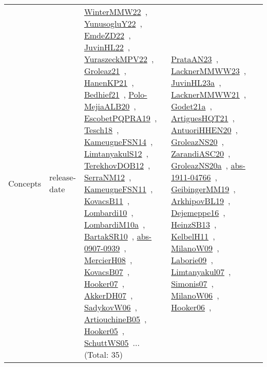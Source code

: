 {\begin{longtable}{lp{3cm}>{\raggedright\arraybackslash}p{6cm}>{\raggedright\arraybackslash}p{6cm}>{\raggedright\arraybackslash}p{8cm}}
Concepts & release-date & \href{works/WinterMMW22.pdf}{WinterMMW22}~\cite{WinterMMW22}, \href{works/YunusogluY22.pdf}{YunusogluY22}~\cite{YunusogluY22}, \href{works/EmdeZD22.pdf}{EmdeZD22}~\cite{EmdeZD22}, \href{works/JuvinHL22.pdf}{JuvinHL22}~\cite{JuvinHL22}, \href{works/YuraszeckMPV22.pdf}{YuraszeckMPV22}~\cite{YuraszeckMPV22}, \href{works/Groleaz21.pdf}{Groleaz21}~\cite{Groleaz21}, \href{works/HanenKP21.pdf}{HanenKP21}~\cite{HanenKP21}, \href{works/Bedhief21.pdf}{Bedhief21}~\cite{Bedhief21}, \href{works/Polo-MejiaALB20.pdf}{Polo-MejiaALB20}~\cite{Polo-MejiaALB20}, \href{works/EscobetPQPRA19.pdf}{EscobetPQPRA19}~\cite{EscobetPQPRA19}, \href{works/Tesch18.pdf}{Tesch18}~\cite{Tesch18}, \href{works/KameugneFSN14.pdf}{KameugneFSN14}~\cite{KameugneFSN14}, \href{works/LimtanyakulS12.pdf}{LimtanyakulS12}~\cite{LimtanyakulS12}, \href{works/TerekhovDOB12.pdf}{TerekhovDOB12}~\cite{TerekhovDOB12}, \href{works/SerraNM12.pdf}{SerraNM12}~\cite{SerraNM12}, \href{works/KameugneFSN11.pdf}{KameugneFSN11}~\cite{KameugneFSN11}, \href{works/KovacsB11.pdf}{KovacsB11}~\cite{KovacsB11}, \href{works/Lombardi10.pdf}{Lombardi10}~\cite{Lombardi10}, \href{works/LombardiM10a.pdf}{LombardiM10a}~\cite{LombardiM10a}, \href{works/BartakSR10.pdf}{BartakSR10}~\cite{BartakSR10}, \href{works/abs-0907-0939.pdf}{abs-0907-0939}~\cite{abs-0907-0939}, \href{works/MercierH08.pdf}{MercierH08}~\cite{MercierH08}, \href{works/KovacsB07.pdf}{KovacsB07}~\cite{KovacsB07}, \href{works/Hooker07.pdf}{Hooker07}~\cite{Hooker07}, \href{works/AkkerDH07.pdf}{AkkerDH07}~\cite{AkkerDH07}, \href{works/SadykovW06.pdf}{SadykovW06}~\cite{SadykovW06}, \href{works/ArtiouchineB05.pdf}{ArtiouchineB05}~\cite{ArtiouchineB05}, \href{works/Hooker05.pdf}{Hooker05}~\cite{Hooker05}, \href{works/SchuttWS05.pdf}{SchuttWS05}~\cite{SchuttWS05}... (Total: 35) & \href{works/PrataAN23.pdf}{PrataAN23}~\cite{PrataAN23}, \href{works/LacknerMMWW23.pdf}{LacknerMMWW23}~\cite{LacknerMMWW23}, \href{works/JuvinHL23a.pdf}{JuvinHL23a}~\cite{JuvinHL23a}, \href{works/LacknerMMWW21.pdf}{LacknerMMWW21}~\cite{LacknerMMWW21}, \href{works/Godet21a.pdf}{Godet21a}~\cite{Godet21a}, \href{works/ArtiguesHQT21.pdf}{ArtiguesHQT21}~\cite{ArtiguesHQT21}, \href{works/AntuoriHHEN20.pdf}{AntuoriHHEN20}~\cite{AntuoriHHEN20}, \href{works/GroleazNS20.pdf}{GroleazNS20}~\cite{GroleazNS20}, \href{works/ZarandiASC20.pdf}{ZarandiASC20}~\cite{ZarandiASC20}, \href{works/GroleazNS20a.pdf}{GroleazNS20a}~\cite{GroleazNS20a}, \href{works/abs-1911-04766.pdf}{abs-1911-04766}~\cite{abs-1911-04766}, \href{works/GeibingerMM19.pdf}{GeibingerMM19}~\cite{GeibingerMM19}, \href{works/ArkhipovBL19.pdf}{ArkhipovBL19}~\cite{ArkhipovBL19}, \href{works/Dejemeppe16.pdf}{Dejemeppe16}~\cite{Dejemeppe16}, \href{works/HeinzSB13.pdf}{HeinzSB13}~\cite{HeinzSB13}, \href{works/KelbelH11.pdf}{KelbelH11}~\cite{KelbelH11}, \href{works/MilanoW09.pdf}{MilanoW09}~\cite{MilanoW09}, \href{works/Laborie09.pdf}{Laborie09}~\cite{Laborie09}, \href{works/Limtanyakul07.pdf}{Limtanyakul07}~\cite{Limtanyakul07}, \href{works/Simonis07.pdf}{Simonis07}~\cite{Simonis07}, \href{works/MilanoW06.pdf}{MilanoW06}~\cite{MilanoW06}, \href{works/Hooker06.pdf}{Hooker06}~\cite{Hooker06}, 
\end{longtable}}

